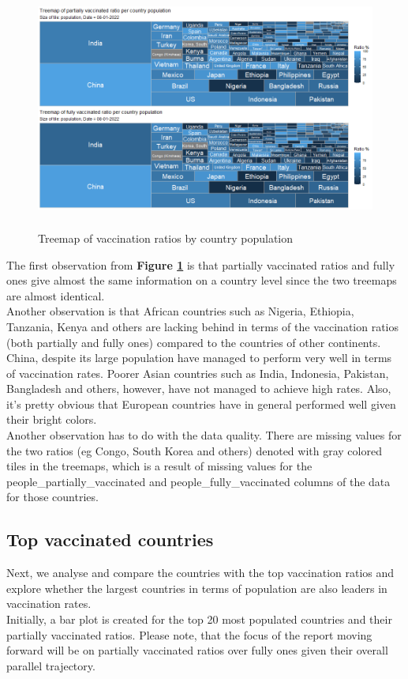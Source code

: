 \begin{figure}[h]
    \centering
    \includegraphics[width=12cm, height=8cm]{figures/Treemap - all countries (fully and partially).png}
    \caption{Treemap of vaccination ratios by country population}
    \label{fig:world_ratios_treemap}
\end{figure}
\FloatBarrier %

The first observation from \textbf{Figure \ref{fig:world_ratios_treemap}} is that partially vaccinated ratios and fully ones give almost the same information on a country level since the two treemaps are almost identical.
\\
Another observation is that African countries such as Nigeria, Ethiopia, Tanzania, Kenya and others are lacking behind in terms of the vaccination ratios (both partially and fully ones) compared to the countries of other continents.
\\
China, despite its large population have managed to perform very well in terms of vaccination rates. Poorer Asian countries such as India, Indonesia, Pakistan, Bangladesh and others, however, have not managed to achieve high rates. Also, it's pretty obvious that European countries have in general performed well given their bright colors.
\\
Another observation has to do with the data quality. There are missing values for the two ratios (eg Congo, South Korea and others) denoted with gray colored tiles in the treemaps, which is a result of missing values for the people\_partially\_vaccinated and people\_fully\_vaccinated columns of the data for those countries.

\subsection{Top vaccinated countries}
Next, we analyse and compare the countries with the top vaccination ratios and explore whether the largest countries in terms of population are also leaders in vaccination rates. \\
Initially, a bar plot is created for the top 20 most populated countries and their partially vaccinated ratios. Please note, that the focus of the report moving forward will be on partially vaccinated ratios over fully ones given their overall parallel trajectory.


